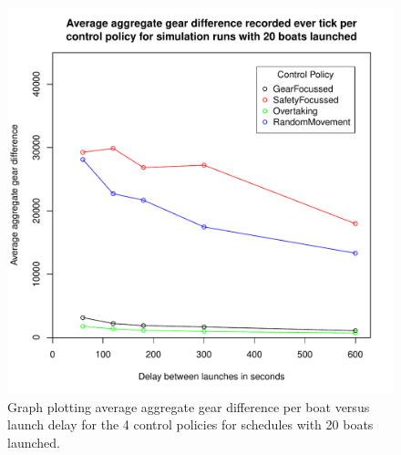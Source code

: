 \begin{figure}
\begin{center}
  \includegraphics[scale=0.8]{"images/graphs/Average aggregate gear difference recorded ever tick per control policy for simulation runs with 20 boats launched"}
  \caption{Graph plotting average aggregate gear difference per boat versus launch delay for the 4 control policies for schedules with 20 boats launched.}
  \label{appendix:graphs:gear_difference_20_launches}
\end{center}
\end{figure}

